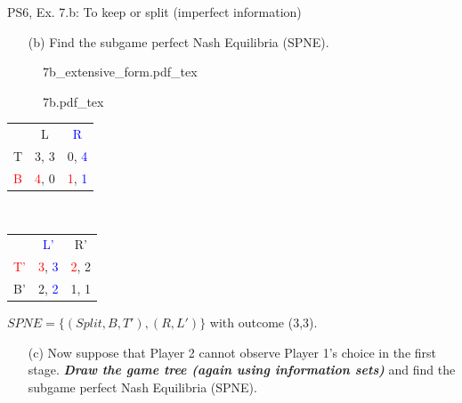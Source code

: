 \begin{frame}{PS6, Ex. 7.b: To keep or split (imperfect information)}
  \begin{itemize}
    \item[(b)] Find the subgame perfect Nash Equilibria (SPNE).
  \end{itemize}
  \vspace{-4pt}
  \begin{figure}[!h]
    \center
    \def\svgwidth{.8\columnwidth}
    {7b_extensive_form.pdf_tex}
  \end{figure}
  \vspace{-2pt}
  \begin{multicols}{2}
    \begin{figure}[!h]
      \center
      \def\svgwidth{.5\columnwidth}
      {7b.pdf_tex}
    \end{figure}
    \vspace{-8pt}
    \begin{table}
      \begin{tabular}{l|c|c|}
        \multicolumn{1}{c}{} & \multicolumn{1}{c}{L} & \multicolumn{1}{c}{\textcolor{blue}{R}} \\\cline{2-3}
        T & 3, 3 & 0, \textcolor{blue}{4} \\\cline{2-3}
        \textcolor{red}{B} & \textcolor{red}{4}, 0 & \textcolor{red}{1}, \textcolor{blue}{1} \\\cline{2-3}
        \end{tabular}\
        \begin{tabular}{l|c|c|}
          \multicolumn{1}{c}{} & \multicolumn{1}{c}{\textcolor{blue}{L'}} & \multicolumn{1}{c}{R'} \\\cline{2-3}
          \textcolor{red}{T'} & \textcolor{red}{3}, \textcolor{blue}{3} & \textcolor{red}{2}, 2 \\\cline{2-3}
          B' & 2, \textcolor{blue}{2} & 1, 1 \\\cline{2-3}
        \end{tabular}
    \end{table}
  \vfill\null\columnbreak
  \vspace{-8pt}
  $SPNE=\{(Split,B,T'),(R,L')\}$ with outcome (3,3).
  \vspace{-6pt}
  \begin{itemize}
    \item[(c)] Now suppose that Player 2 cannot observe Player 1’s choice in the first stage. \textbf{\textit{Draw the game tree (again using information sets)}} and find the subgame perfect Nash Equilibria (SPNE).
  \end{itemize}
  \vfill\null
  \end{multicols}
\end{frame}


